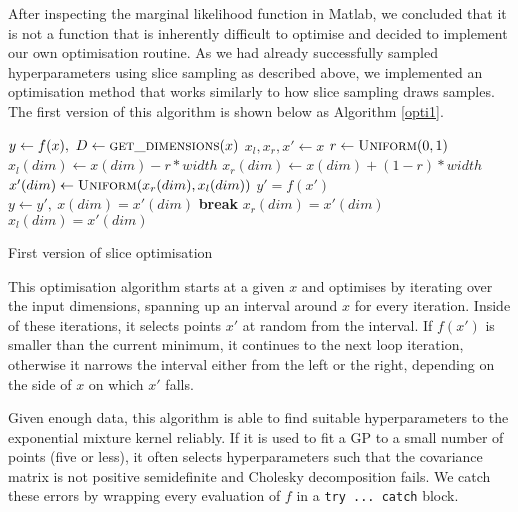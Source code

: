 \documentclass[a4paper,12pt,twoside,openright]{report}
\newcommand{\Break}{\State \textbf{break} }
\begin{document}
After inspecting the marginal likelihood function in Matlab, we concluded that it is not a function that is inherently difficult to optimise and decided to implement our own optimisation routine. As we had already successfully sampled hyperparameters using slice sampling as described above, we implemented an optimisation method that works similarly to how slice sampling draws samples. The first version of this algorithm is shown below as Algorithm \ref{opti1}.


\begin{algorithm}
\begin{algorithmic}[1]
\State $y\gets f(x),\ D\gets \Call{get\_dimensions}{x}$
\State $x_l, x_r, x'\gets x$
\State $r\gets \Call{Uniform}{0, 1}$
\State $x_l(dim)\gets x(dim) - r * width$
\State $x_r(dim)\gets x(dim) + (1 - r) * width$
\State $x'(dim)\gets \Call{Uniform}{x_r(dim), x_l(dim)}$
\State $y' = f(x')$
\State $y\gets y',\ x(dim) = x'(dim)$
\Break
\EndIf
{}
\State $x_r(dim) = x'(dim)$
\State $x_l(dim) = x'(dim)$
\EndIf
\EndFor
\EndFor
\EndFor
\EndProcedure
\end{algorithmic}
\caption{First version of slice optimisation}
\label{opti1}
\end{algorithm}

This optimisation algorithm starts at a given $x$ and optimises by iterating over the input dimensions, spanning up an interval around $x$ for every iteration. Inside of these iterations, it selects points $x'$ at random from the interval. If $f(x')$ is smaller than the current minimum, it continues to the next loop iteration, otherwise it narrows the interval either from the left or the right, depending on the side of $x$ on which $x'$ falls.

Given enough data, this algorithm is able to find suitable hyperparameters to the exponential mixture kernel reliably. If it is used to fit a GP to a small number of points (five or less), it often selects hyperparameters such that the covariance matrix is not positive semidefinite and Cholesky decomposition fails. We catch these errors by wrapping every evaluation of $f$ in a \texttt{try ... catch} block. 
\end{document}
